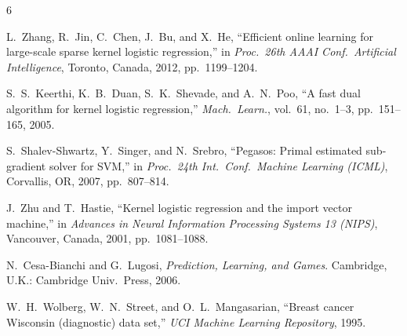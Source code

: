 \documentclass[conference,10pt]{IEEEtran}
\begin{document}
\begin{thebibliography}{6}

L.~Zhang, R.~Jin, C.~Chen, J.~Bu, and X.~He,
``Efficient online learning for large-scale sparse kernel logistic regression,''
in \emph{Proc.\ 26th AAAI Conf.\ Artificial Intelligence}, Toronto, Canada, 2012, pp.~1199--1204.

S.~S.~Keerthi, K.~B.~Duan, S.~K.~Shevade, and A.~N.~Poo,
``A fast dual algorithm for kernel logistic regression,''
\emph{Mach.\ Learn.}, vol.~61, no.~1--3, pp.~151--165, 2005.

S.~Shalev-Shwartz, Y.~Singer, and N.~Srebro,
``Pegasos: Primal estimated sub-gradient solver for SVM,''
in \emph{Proc.\ 24th Int.\ Conf.\ Machine Learning (ICML)}, Corvallis, OR, 2007, pp.~807--814.

J.~Zhu and T.~Hastie,
``Kernel logistic regression and the import vector machine,''
in \emph{Advances in Neural Information Processing Systems 13 (NIPS)}, Vancouver, Canada, 2001, pp.~1081--1088.

N.~Cesa-Bianchi and G.~Lugosi,
\emph{Prediction, Learning, and Games}.
Cambridge, U.K.: Cambridge Univ.\ Press, 2006.

W.~H.~Wolberg, W.~N.~Street, and O.~L.~Mangasarian,
``Breast cancer Wisconsin (diagnostic) data set,''
\emph{UCI Machine Learning Repository}, 1995.

\end{thebibliography}
\end{document}
